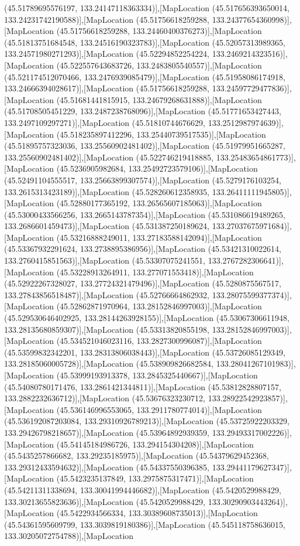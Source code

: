 (45.51789695576197, 133.24147118363334)],[MapLocation (45.517656393650014, 133.24231742190588)],[MapLocation (45.51756618259288, 133.24377654360998)],[MapLocation (45.51756618259288, 133.24460400376273)],[MapLocation (45.51813751684548, 133.24516190323783)],[MapLocation (45.52057313989365, 133.24571980271293)],[MapLocation (45.52294852254224, 133.2469214323516)],[MapLocation (45.522557643683726, 133.2483805540557)],[MapLocation (45.521174512070466, 133.2476939085479)],[MapLocation (45.51958086174918, 133.24666394028617)],[MapLocation (45.51756618259288, 133.24597729477836)],[MapLocation (45.51681441815915, 133.24679268631888)],[MapLocation (45.51708505451229, 133.2487238768096)],[MapLocation (45.51771653427443, 133.2497109297271)],[MapLocation (45.51810744676629, 133.2512987974639)],[MapLocation (45.518235897412296, 133.25440739517535)],[MapLocation (45.51895757323036, 133.25560902481402)],[MapLocation (45.51979951665287, 133.25560902481402)],[MapLocation (45.522746219418885, 133.25483654861773)],[MapLocation (45.5236905982684, 133.25492723579106)],[MapLocation (45.52491104555517, 133.25663899307574)],[MapLocation (45.5279176103254, 133.2615313423189)],[MapLocation (45.528260612358935, 133.26411111945805)],[MapLocation (45.52880177365192, 133.26565607185063)],[MapLocation (45.53000433566256, 133.2665143787354)],[MapLocation (45.531086619489265, 133.2686601459473)],[MapLocation (45.531387250189624, 133.27037675971684)],[MapLocation (45.53216888249011, 133.27183588142094)],[MapLocation (45.53367932291624, 133.2738895386956)],[MapLocation (45.53421310022614, 133.2760415851563)],[MapLocation (45.53307075241551, 133.2767282306641)],[MapLocation (45.53228913264911, 133.277071553418)],[MapLocation (45.52922267328027, 133.27724321479496)],[MapLocation (45.5280875567517, 133.27843856518487)],[MapLocation (45.52766664862932, 133.28075599377374)],[MapLocation (45.52862871970964, 133.28152846997003)],[MapLocation (45.529530646402925, 133.28144263928155)],[MapLocation (45.53067306611948, 133.28135680859307)],[MapLocation (45.53313820855198, 133.28152846997003)],[MapLocation (45.534521046023116, 133.2827300996087)],[MapLocation (45.53599832342201, 133.28313806038443)],[MapLocation (45.53726085129349, 133.28185060005728)],[MapLocation (45.538909826682584, 133.28041267101983)],[MapLocation (45.53999193913378, 133.2845325440667)],[MapLocation (45.54080780171476, 133.2861421344811)],[MapLocation (45.53812828807157, 133.2882232636712)],[MapLocation (45.53676323230712, 133.28922542923857)],[MapLocation (45.536146996553065, 133.2911780774014)],[MapLocation (45.536192087203084, 133.29310926789213)],[MapLocation (45.53725922203329, 133.29426798218657)],[MapLocation (45.53964892939359, 133.29493317002226)],[MapLocation (45.54145184986726, 133.294154304208)],[MapLocation (45.5435257866682, 133.29235185975)],[MapLocation (45.54379629452368, 133.29312433594632)],[MapLocation (45.54337550396385, 133.29441179627347)],[MapLocation (45.5423235137849, 133.2975875317471)],[MapLocation (45.54211311338694, 133.30041994446682)],[MapLocation (45.5420529988429, 133.30213655823636)],[MapLocation (45.5420529988429, 133.30290903443264)],[MapLocation (45.5422934566334, 133.30389608735013)],[MapLocation (45.54361595609799, 133.3039819180386)],[MapLocation (45.545118758636015, 133.30205072754788)],[MapLocation 